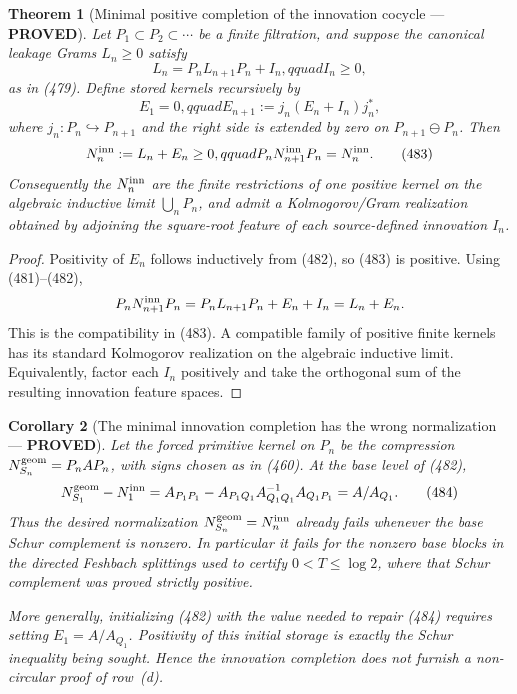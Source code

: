 \documentclass[11pt]{article}
\newtheorem{theorem}{Theorem}
\newtheorem{corollary}[theorem]{Corollary}
\newcommand{\PROVED}{\textcolor{green!45!black}{\textbf{PROVED}}}
\begin{document}
\begin{theorem}[Minimal positive completion of the innovation cocycle ---
\PROVED]
Let \(P_1\subset P_2\subset\cdots\) be a finite filtration, and suppose the
canonical leakage Grams \(L_n\ge0\) satisfy
\begin{equation}
 L_n=P_nL_{n+1}P_n+I_n,qquad I_n\ge0,               \tag{481}
\end{equation}
as in (479).  Define stored kernels recursively by
\begin{equation}
 E_1=0,qquad
 E_{n+1}:=j_n(E_n+I_n)j_n^*,                        \tag{482}
\end{equation}
where \(j_n:P_n\hookrightarrow P_{n+1}\) and the right side is extended by
zero on \(P_{n+1}\ominus P_n\).  Then
\begin{equation}
 N_n^{\rm inn}:=L_n+E_n\ge0,qquad
 P_nN_{n+1}^{\rm inn}P_n=N_n^{\rm inn}.             \tag{483}
\end{equation}
Consequently the \(N_n^{\rm inn}\) are the finite restrictions of one
positive kernel on the algebraic inductive limit \(\bigcup_nP_n\), and admit
a Kolmogorov/Gram realization obtained by adjoining the square-root feature
of each source-defined innovation \(I_n\).
\end{theorem}

\begin{proof}
Positivity of \(E_n\) follows inductively from (482), so (483) is positive.
Using (481)--(482),
\[
 P_nN_{n+1}^{\rm inn}P_n
 =P_nL_{n+1}P_n+E_n+I_n=L_n+E_n.
\]
This is the compatibility in (483).  A compatible family of positive
finite kernels has its standard Kolmogorov realization on the algebraic
inductive limit.  Equivalently, factor each \(I_n\) positively and take the
orthogonal sum of the resulting innovation feature spaces.
\end{proof}

\begin{corollary}[The minimal innovation completion has the wrong
normalization --- \PROVED]
Let the forced primitive kernel on \(P_n\) be the compression
\(N_{S_n}^{\rm geom}=P_nAP_n\), with signs chosen as in (460).  At the base
level of (482),
\begin{equation}
 N_{S_1}^{\rm geom}-N_1^{\rm inn}
 =A_{P_1P_1}-A_{P_1Q_1}A_{Q_1Q_1}^{-1}A_{Q_1P_1}
 =A/A_{Q_1}.                                         \tag{484}
\end{equation}
Thus the desired normalization
\(N_{S_n}^{\rm geom}=N_n^{\rm inn}\) already fails whenever the base
Schur complement is nonzero.  In particular it fails for the nonzero base
blocks in the directed Feshbach splittings used to certify
\(0<T\le\log2\), where that Schur complement was proved strictly positive.

More generally, initializing (482) with the value needed to repair (484)
requires setting \(E_1=A/A_{Q_1}\).  Positivity of this initial storage is
exactly the Schur inequality being sought.  Hence the innovation completion
does not furnish a non-circular proof of row~(d).
\end{corollary}
\end{document}
